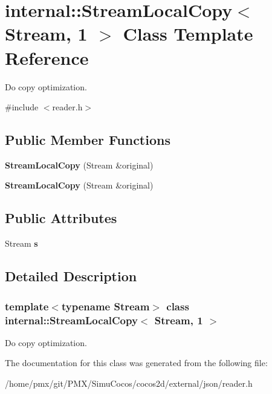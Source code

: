 \hypertarget{classinternal_1_1StreamLocalCopy_3_01Stream_00_011_01_4}{}\section{internal\+:\+:Stream\+Local\+Copy$<$ Stream, 1 $>$ Class Template Reference}
\label{classinternal_1_1StreamLocalCopy_3_01Stream_00_011_01_4}


Do copy optimization.  




{\ttfamily \#include $<$reader.\+h$>$}

\subsection*{Public Member Functions}
\begin{DoxyCompactItemize}
\item 
\mbox{\label{classinternal_1_1StreamLocalCopy_3_01Stream_00_011_01_4_aba475fed3eecc9f77ff059fdb7fe2a32}} 
{\bfseries Stream\+Local\+Copy} (Stream \&original)
\item 
\mbox{\label{classinternal_1_1StreamLocalCopy_3_01Stream_00_011_01_4_aba475fed3eecc9f77ff059fdb7fe2a32}} 
{\bfseries Stream\+Local\+Copy} (Stream \&original)
\end{DoxyCompactItemize}
\subsection*{Public Attributes}
\begin{DoxyCompactItemize}
\item 
\mbox{\label{classinternal_1_1StreamLocalCopy_3_01Stream_00_011_01_4_a1d3e8ae8756325df25715d4ffb9c1b44}} 
Stream {\bfseries s}
\end{DoxyCompactItemize}


\subsection{Detailed Description}
\subsubsection*{template$<$typename Stream$>$\newline
class internal\+::\+Stream\+Local\+Copy$<$ Stream, 1 $>$}

Do copy optimization. 

The documentation for this class was generated from the following file\+:\begin{DoxyCompactItemize}
\item 
/home/pmx/git/\+P\+M\+X/\+Simu\+Cocos/cocos2d/external/json/reader.\+h\end{DoxyCompactItemize}
